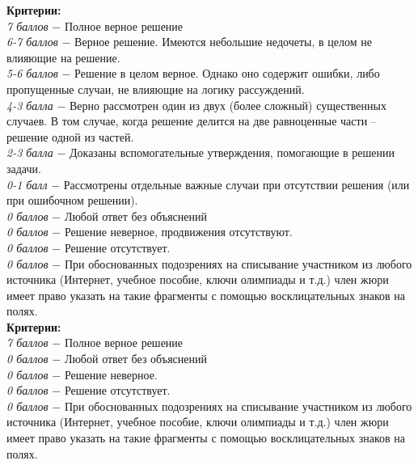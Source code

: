  \textbf{Критерии:} \\
\textit{7 баллов} $-$ Полное верное решение\\
\textit{6-7 баллов} $-$ Верное решение. Имеются небольшие недочеты, в целом не влияющие на решение.\\
\textit{5-6 баллов} $-$ Решение в целом верное. Однако оно содержит ошибки, либо пропущенные случаи, не влияющие на логику рассуждений.\\
\textit{4-3 балла} $-$ Верно рассмотрен один из двух (более сложный) существенных случаев. В том случае, когда решение делится на две равноценные части – решение одной из частей. 
\\
\textit{2-3 балла} $-$ Доказаны вспомогательные утверждения, помогающие в решении задачи.
\\
\textit{0-1 балл} $-$ Рассмотрены отдельные важные случаи при отсутствии решения (или при ошибочном решении).\\
\textit{0 баллов} $-$ Любой ответ без объяснений\\
\textit{0 баллов} $-$ Решение неверное, продвижения отсутствуют.\\
\textit{0 баллов} $-$ Решение отсутствует.\\
\textit{0 баллов} $-$ При обоснованных подозрениях на списывание участником из любого источника (Интернет, учебное пособие, ключи олимпиады и т.д.) член жюри имеет право указать на такие фрагменты с помощью восклицательных знаков на полях. \\

 \textbf{Критерии:} \\
\textit{7 баллов} $-$ Полное верное решение\\
\textit{0 баллов} $-$ Любой ответ без объяснений\\
\textit{0 баллов} $-$ Решение неверное.\\
\textit{0 баллов} $-$ Решение отсутствует.\\
\textit{0 баллов} $-$ При обоснованных подозрениях на списывание участником из любого источника (Интернет, учебное пособие, ключи олимпиады и т.д.) член жюри имеет право указать на такие фрагменты с помощью восклицательных знаков на полях. \\